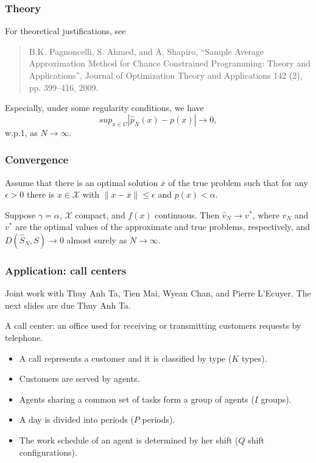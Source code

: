 \documentclass{beamer}
\begin{document}
\begin{frame}
	\frametitle{Theory}
	
	For theoretical justifications, see
	\begin{quote}
		B.K. Pagnoncelli, S. Ahmed, and A. Shapiro, ``Sample Average Approximation Method for Chance
		Constrained Programming: Theory and Applications'', Journal of Optimization Theory and Applications 142 (2), pp. 399--416, 2009.
	\end{quote}
	
	\mbox{}
	
	Especially, under some regularity conditions, we have
	\[
	sup_{x \in C} |\hat{p}_N(x) - p(x)| \rightarrow 0,
	\]
	w.p.1, as $N \rightarrow \infty$.
	
\end{frame}

\begin{frame}
	\frametitle{Convergence}
	
	Assume that  there is an optimal solution $\overline{x}$ of the true problem such that for any $\epsilon > 0$ there is $x \in \mathcal{X}$ with $\| x - \overline{x} \| \leq \epsilon$ and $p(x) < \alpha$.
	
	\mbox{}
	
	\begin{theorem}
		Suppose $\gamma = \alpha$, $\mathcal{X}$ compact, and $f(x)$ continuous.
		Then $\hat{v}_N \rightarrow v^*$, where $\hat{v}_N$ and $v^*$ are the optimal values of the approximate and true problems, respectively, and $D(\hat{S}_N,S) \rightarrow 0$ almost surely as $N \rightarrow \infty$.
	\end{theorem}
	
\end{frame}

\begin{frame}
	\frametitle{Application: call centers}
	
	Joint work with Thuy Anh Ta, Tien Mai, Wyean Chan, and Pierre L'Ecuyer.
	The next slides are due Thuy Anh Ta.
	
	\mbox{}
	
	{\color{red}A call center}: an  office used for receiving or transmitting customers requests by {\color{red}telephone}.
	
	
	\begin{itemize}
		\item A {\color{blue}call} represents a customer and it is classified by {\color{blue}type} ($K$ types). 
		\item Customers are served by {\color{blue}agents}.
		\item Agents sharing a common set of tasks form a {\color{blue}group} of agents ($I$ groups).
		\item A day is divided into {\color{blue}periods} ($P$ periods).
		\item The work schedule of an agent is determined by her {\color{blue}shift} ($Q$ shift configurations).
	\end{itemize}
	
\end{frame}
\end{document}
